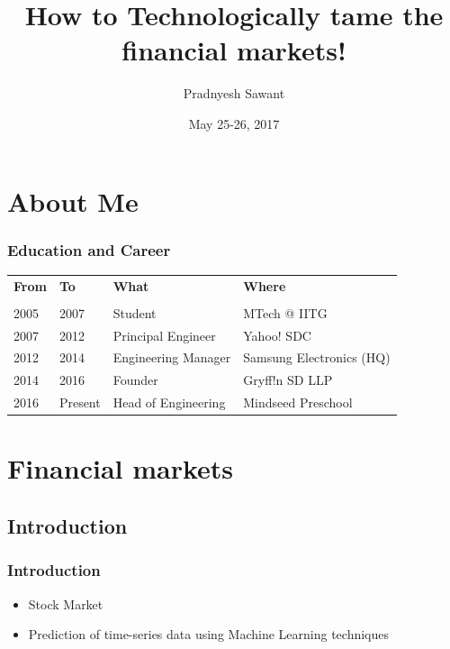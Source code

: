 \documentclass{beamer}
\title{How to Technologically tame the financial markets!}
\author{Pradnyesh Sawant}
\date{May 25-26, 2017}
\begin{document}
\frame{\titlepage}

\section{About Me}
\begin{frame}
  \frametitle{Education and Career}
  \begin{tabular}{ l  l  l  l }
    \textbf{From} & \textbf{To} & \textbf{What} & \textbf{Where}\\
    & & & \\
    2005 & 2007 & Student & MTech @ IITG\\
    2007 & 2012 & Principal Engineer & Yahoo! SDC\\
    2012 & 2014 & Engineering Manager & Samsung Electronics (HQ)\\
    2014 & 2016 & Founder & Gryff!n SD LLP\\
    2016 & Present & Head of Engineering & Mindseed Preschool\\
  \end{tabular}
\end{frame}

\section{Financial markets}
\subsection{Introduction}
\begin{frame}
  \frametitle{Introduction}
  \begin{itemize}[<+->]
  \item Stock Market
  \item Prediction of time-series data using Machine Learning techniques
  \end{itemize}
\end{frame}

\end{document}
